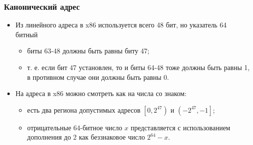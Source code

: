 \begin{frame}
\frametitle{Канонический адрес}
\begin{itemize}
  \item Из линейного адреса в x86 используется всего 48 бит, но указатель 64
  битный
  \begin{itemize}
    \item биты 63-48 должны быть равны биту 47;
    \item т. е. если бит 47 установлен, то и биты 64-48 тоже должны быть равны
    1, в противном случае они должны быть равны 0.
  \end{itemize}
  \item На адреса в x86 можно смотреть как на числа со знаком:
  \begin{itemize}
    \item есть два региона допустимых адресов $\left[0, 2^{47}\right)$ и
    $\left(-2^{47}, -1\right]$;
    \item отрицательные 64-битное число $x$ представляется с использованием
    дополнения до 2 как беззнаковое число $2^{64} - x$.
  \end{itemize}
\end{itemize}
\end{frame}
